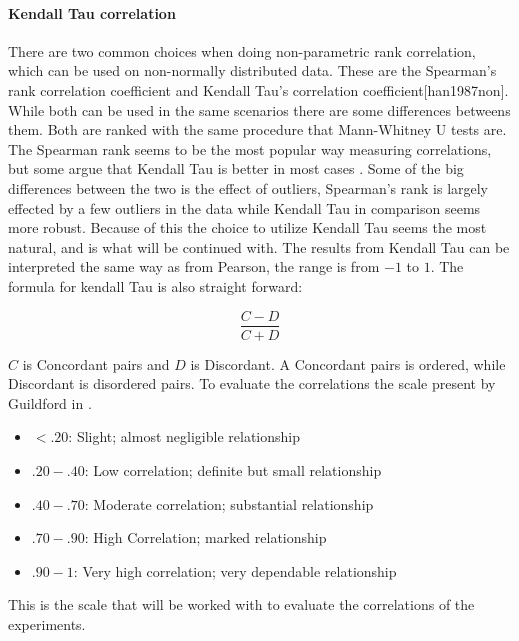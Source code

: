 \paragraph{Kendall Tau correlation}
There are two common choices when doing non-parametric rank correlation, which can be used on non-normally distributed data. These are the Spearman's rank correlation coefficient and Kendall Tau's correlation coefficient[han1987non]. While both can be used in the same scenarios there are some differences betweens them. Both are ranked with the same procedure that Mann-Whitney U tests are. The Spearman rank seems to be the most popular way measuring correlations, but some argue that Kendall Tau is better in most cases \cite{gilpin1993table}. Some of the big differences between the two is the effect of outliers, Spearman's rank is largely effected by a few outliers in the data while Kendall Tau in comparison seems more robust. Because of this the choice to utilize Kendall Tau seems the most natural, and is what will be continued with. The results from Kendall Tau can be interpreted the same way as from Pearson, the range is from $-1$ to $1$. The formula for kendall Tau is also straight forward:

\begin{equation}
    \frac{C-D}{C+D}
\end{equation}

$C$ is Concordant pairs and $D$ is Discordant. A Concordant pairs is ordered, while Discordant is disordered pairs\cite{kendall1938new}. To evaluate the correlations the scale present by Guildford in \cite[219]{guilford1950fundamental}.
\begin{itemize}
    \item $<.20$: Slight; almost negligible relationship
    \item $.20-.40$: Low correlation; definite but small relationship
    \item $.40-.70$: Moderate correlation; substantial relationship
    \item $.70-.90$: High Correlation; marked relationship
    \item $.90-1$: Very high correlation; very dependable relationship
\end{itemize}

This is the scale that will be worked with to evaluate the correlations of the experiments.

